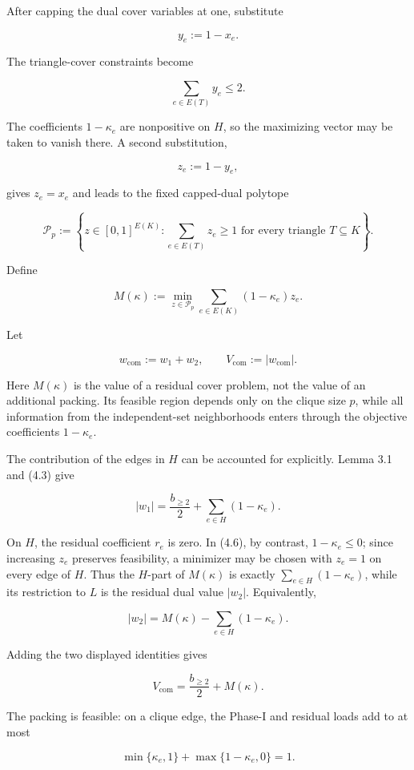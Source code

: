 \documentclass[
  american,
  11pt,
  a4paper,
]{article}
\begin{document}
After capping the dual cover variables at one, substitute

\[
y_e:=1-x_e.
\]

The triangle-cover constraints become

\[
\sum_{e\in E(T)}y_e\le2.
\]

The coefficients \(1-\kappa_e\) are nonpositive on \(H\), so the maximizing vector may be taken to vanish there. A second substitution,

\[
z_e:=1-y_e,
\]

gives \(z_e=x_e\) and leads to the fixed capped-dual polytope

\[
\mathcal P_p
:=
\left\{
z\in[0,1]^{E(K)}:
\sum_{e\in E(T)}z_e\ge1
\text{ for every triangle }T\subseteq K
\right\}.
\tag{4.5}
\]

Define

\[
M(\kappa)
:=
\min_{z\in\mathcal P_p}
\sum_{e\in E(K)}(1-\kappa_e)z_e.
\tag{4.6}
\]

Let

\[
w_{\mathrm{com}}:=w_1+w_2,
\qquad
V_{\mathrm{com}}:=|w_{\mathrm{com}}|.
\]

Here \(M(\kappa)\) is the value of a residual cover problem, not the value of an additional packing. Its feasible region depends only on the clique size \(p\), while all information from the independent-set neighborhoods enters through the objective coefficients \(1-\kappa_e\).

The contribution of the edges in \(H\) can be accounted for explicitly. Lemma 3.1 and (4.3) give

\[
|w_1|
=
\frac{b_{\ge2}}2+\sum_{e\in H}(1-\kappa_e).
\]

On \(H\), the residual coefficient \(r_e\) is zero. In (4.6), by contrast, \(1-\kappa_e\le0\); since increasing \(z_e\) preserves feasibility, a minimizer may be chosen with \(z_e=1\) on every edge of \(H\). Thus the \(H\)-part of \(M(\kappa)\) is exactly \(\sum_{e\in H}(1-\kappa_e)\), while its restriction to \(L\) is the residual dual value \(|w_2|\). Equivalently,

\[
|w_2|=M(\kappa)-\sum_{e\in H}(1-\kappa_e).
\]

Adding the two displayed identities gives

\[
\boxed{
V_{\mathrm{com}}
=
\frac{b_{\ge2}}2+M(\kappa).
}
\tag{4.7}
\]

The packing is feasible: on a clique edge, the Phase-I and residual loads add to at most

\[
\min\{\kappa_e,1\}
+
\max\{1-\kappa_e,0\}
=
1.
\]
\end{document}
